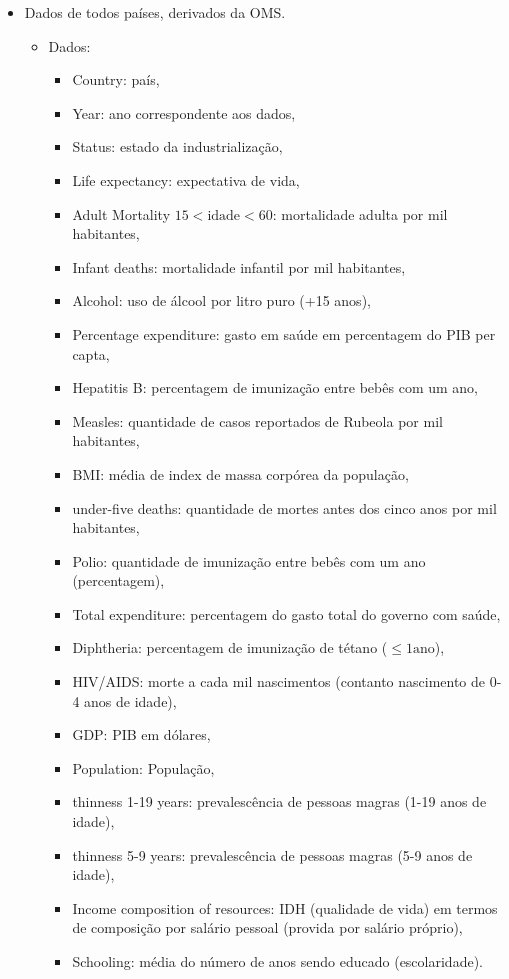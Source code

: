 \documentclass[11pt]{article}
\begin{document}
\begin{itemize}
\item Dados de todos países, derivados da OMS.

\begin{itemize}
\item Dados:
\begin{itemize}
\item Country: país,
\item Year: ano correspondente aos dados,
\item Status: estado da industrialização,
\item Life expectancy: expectativa de vida,
\item Adult Mortality \(15<\text{idade}<60\): mortalidade adulta por mil habitantes,
\item Infant deaths: mortalidade infantil por mil habitantes,
\item Alcohol: uso de álcool por litro puro (+15 anos),
\item Percentage expenditure: gasto em saúde em percentagem do PIB per capta,
\item Hepatitis B: percentagem de imunização entre bebês com um ano,
\item Measles: quantidade de casos reportados de Rubeola por mil habitantes,
\item BMI: média de index de massa corpórea da população,
\item under-five deaths: quantidade de mortes antes dos cinco anos por mil habitantes,
\item Polio: quantidade de imunização entre bebês com um ano (percentagem),
\item Total expenditure: percentagem do gasto total do governo com saúde,
\item Diphtheria: percentagem de imunização de tétano (\(\leq 1 \text{ano}\)),
\item HIV/AIDS: morte a cada mil nascimentos (contanto nascimento de 0-4 anos de idade),
\item GDP: PIB em dólares,
\item Population: População,
\item thinness  1-19 years: prevalescência de pessoas magras (1-19 anos de idade),
\item thinness 5-9 years: prevalescência de pessoas magras (5-9 anos de idade),
\item Income composition of resources: IDH (qualidade de vida) em termos de composição por salário pessoal (provida por salário próprio),
\item Schooling: média do número de anos sendo educado (escolaridade).
\end{itemize}
\end{itemize}
\end{itemize}
\end{document}
